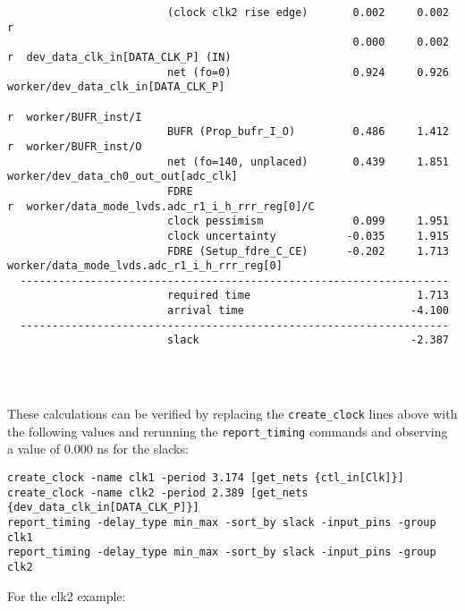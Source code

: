 \documentclass{article}
\begin{document}
\begin{lstlisting}
                         (clock clk2 rise edge)       0.002     0.002 r
                                                      0.000     0.002 r  dev_data_clk_in[DATA_CLK_P] (IN)
                         net (fo=0)                   0.924     0.926    worker/dev_data_clk_in[DATA_CLK_P]
                                                                      r  worker/BUFR_inst/I
                         BUFR (Prop_bufr_I_O)         0.486     1.412 r  worker/BUFR_inst/O
                         net (fo=140, unplaced)       0.439     1.851    worker/dev_data_ch0_out_out[adc_clk]
                         FDRE                                         r  worker/data_mode_lvds.adc_r1_i_h_rrr_reg[0]/C
                         clock pessimism              0.099     1.951
                         clock uncertainty           -0.035     1.915
                         FDRE (Setup_fdre_C_CE)      -0.202     1.713    worker/data_mode_lvds.adc_r1_i_h_rrr_reg[0]
  -------------------------------------------------------------------
                         required time                          1.713
                         arrival time                          -4.100
  -------------------------------------------------------------------
                         slack                                 -2.387




\end{lstlisting}
\fontsize{10}{12}\selectfont
These calculations can be verified by replacing the \texttt{create\_clock} lines above with the following values and rerunning the \texttt{report\_timing} commands and observing a value of 0.000 ns for the slacks:
\begin{lstlisting}
create_clock -name clk1 -period 3.174 [get_nets {ctl_in[Clk]}]
create_clock -name clk2 -period 2.389 [get_nets {dev_data_clk_in[DATA_CLK_P]}]
report_timing -delay_type min_max -sort_by slack -input_pins -group clk1
report_timing -delay_type min_max -sort_by slack -input_pins -group clk2
\end{lstlisting}
For the clk2 example:
\fontsize{6}{12}\selectfont
\end{document}
